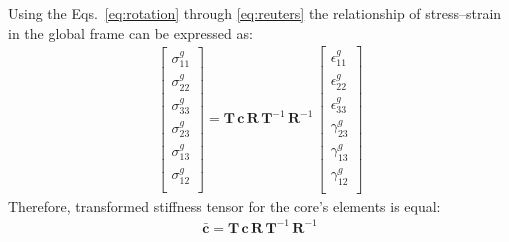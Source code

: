 \documentclass[materials,article,submit,moreauthors,pdftex]{Definitions/mdpi}
\begin{document}
Using the Eqs.~\ref{eq:rotation} through \ref{eq:reuters} the relationship of stress--strain in the global frame can be expressed as:
\begin{eqnarray}
\left [
\begin{array}{c}
\sigma^g_{11}\\
\sigma^g_{22}\\ 
\sigma^g_{33}\\ 
\sigma^g_{23}\\
\sigma^g_{13}\\
\sigma^g_{12}\\
\end{array}
\right ]=
\textbf{T}\,\textbf{c}\,\textbf{R}\,\textbf{T}^{-1}\,\textbf{R}^{-1}\,
\left [
\begin{array}{c}
\epsilon^g_{11}\\
\epsilon^g_{22}\\ 
\epsilon^g_{33}\\
\gamma^g_{23}\\
\gamma^g_{13}\\
\gamma^g_{12}\\
\end{array}
\right ]
\label{eq:stress-strain}
\end{eqnarray}
Therefore, transformed stiffness tensor for the core's elements is equal:
\begin{eqnarray}
\bar{\textbf{c}}=\textbf{T}\,\textbf{c}\,\textbf{R}\,\textbf{T}^{-1}\,\textbf{R}^{-1}
\label{eq:c_global}
\end{eqnarray}
\end{document}
